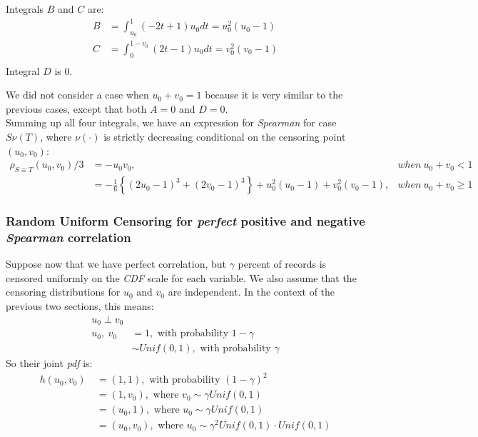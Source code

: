 \documentclass[]{article}
\begin{document}
Integrals $B$ and $C$ are:
	$$
	\begin{aligned}
    B &= \int_{u_0}^1 (-2t + 1)u_0 dt =u_0^2(u_0 - 1)\\
    C &= \int_{0}^{1-v_0} (2t - 1)u_0 dt =v_0^2(v_0 - 1)\\
	\end{aligned}
	$$
Integral $D$ is $0$.

We did not consider a case when $u_0+v_0 = 1$ because it is very similar to the previous cases, except that both $A=0$ and $D=0$.\\
Summing up all four integrals, we have an expression for \emph{Spearman} for case $S\nu(T)$, where $\nu(\cdot)$ is strictly decreasing conditional on the censoring point $(u_0, v_0)$:
	$$
	\begin{aligned}
    \rho_{S\equiv T}(u_0, v_0)/3 &= -u_0v_0, &when~u_0 + v_0 < 1\\
    &= -\frac{1}{6}\left\{  (2u_0 - 1)^3 + (2v_0 - 1)^3 \right\} + u_0^2(u_0 - 1) + v_0^2(v_0 - 1), &when~u_0 + v_0 \geq 1
	\end{aligned}
	$$

\subsubsection{Random Uniform Censoring for \emph{perfect} positive and negative \emph{Spearman} correlation}
Suppose now that we have perfect correlation, but $\gamma$ percent of records is censored uniformly on the \emph{CDF} scale for each variable. We also assume that the censoring distributions for $u_0$ and $v_0$ are independent. In the context of the previous two sections, this means:
  $$
  \begin{aligned}
    u_0 \perp v_0 &\\
    u_0,~v_0~&=1, \text{ with probability }1-\gamma  \\
       &\sim Unif(0, 1), \text{ with probability }\gamma
  \end{aligned}
  $$
So their joint \emph{pdf} is:
  $$
  \begin{aligned}
    h(u_0, v_0)~&=(1, 1), \text{ with probability }(1-\gamma)^2  \\
                &=(1, v_0), \text{ where } v_0\sim \gamma Unif(0, 1) \\
                &=(u_0, 1), \text{ where } u_0\sim \gamma Unif(0, 1) \\
                &=(u_0, v_0), \text{ where } u_0\sim \gamma^2 Unif(0, 1)\cdot Unif(0, 1) \\
  \end{aligned}
  $$
\end{document}
